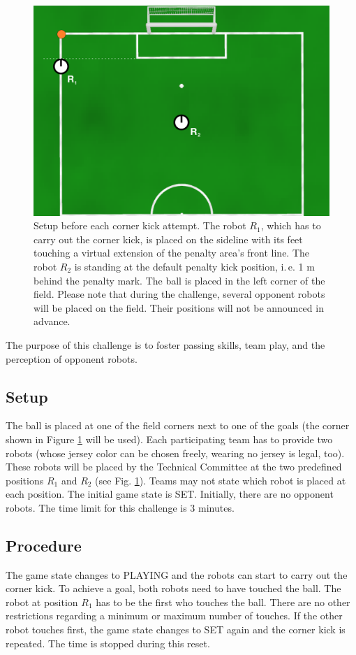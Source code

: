 \documentclass[12pt]{article}
\newcommand{\ie}{\mbox{i.\,e.}\xspace}
\begin{document}
\begin{figure}[t]
\centerline{\includegraphics[width=0.8\columnwidth]{figures/corner-kicks-challenge}}
\caption{Setup before each corner kick attempt. The robot $R_1$, which has to carry out the corner kick, is placed on the sideline with its feet touching a virtual extension of the penalty area's front line. The robot $R_2$ is standing at the default penalty kick position, \ie 1 m behind the penalty mark. The ball is placed in the left corner of the field. Please note that during the challenge, several opponent robots will be placed on the field. Their positions will not be announced in advance.}
\label{fig:corner_kicks_challenge}
\end{figure}


The purpose of this challenge is to foster passing skills, team play, and the perception of opponent robots.

\subsection{Setup}
The ball is placed at one of the field corners next to one of the goals (the corner shown in Figure \ref{fig:corner_kicks_challenge} will be used). Each participating team has to provide two robots (whose jersey color can be chosen freely, wearing no jersey is legal, too). These robots will be placed by the Technical Committee at the two predefined positions $R_1$ and $R_2$ (see Fig. \ref{fig:corner_kicks_challenge}).  Teams may not state which robot is placed at each position. The initial game state is SET. Initially, there are no opponent robots. The time limit for this challenge is 3 minutes.

\subsection{Procedure}
The game state changes to PLAYING and the robots can start to carry out the corner kick. To achieve a goal, both robots need to have touched the ball. The robot at position $R_1$ has to be the first who touches the ball. There are no other restrictions regarding a minimum or maximum number of touches. If the other robot touches first, the game state changes to SET again and the corner kick is repeated. The time is stopped during this reset.
\end{document}
